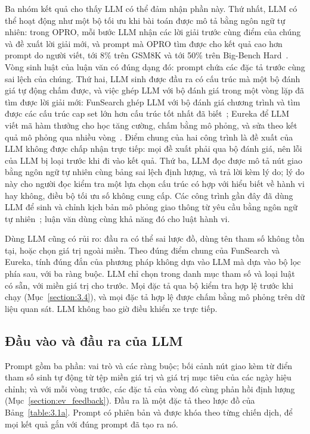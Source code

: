 \documentclass[../main.tex]{subfiles}
\begin{document}
Ba nhóm kết quả cho thấy LLM có thể đảm nhận phần này. Thứ nhất, LLM có thể hoạt động như một bộ tối ưu khi bài toán được mô tả bằng ngôn ngữ tự nhiên: trong OPRO, mỗi bước LLM nhận các lời giải trước cùng điểm của chúng và đề xuất lời giải mới, và prompt mà OPRO tìm được cho kết quả cao hơn prompt do người viết, tới 8\% trên GSM8K và tới 50\% trên Big-Bench Hard~\cite{yang2024opro}. Vòng sinh luật của luận văn có đúng dạng đó: prompt chứa các đặc tả trước cùng sai lệch của chúng. Thứ hai, LLM sinh được đầu ra có cấu trúc mà một bộ đánh giá tự động chấm được, và việc ghép LLM với bộ đánh giá trong một vòng lặp đã tìm được lời giải mới: FunSearch ghép LLM với bộ đánh giá chương trình và tìm được các cấu trúc cap set lớn hơn cấu trúc tốt nhất đã biết~\cite{romeraparedes2024funsearch}; Eureka để LLM viết mã hàm thưởng cho học tăng cường, chấm bằng mô phỏng, và sửa theo kết quả mô phỏng qua nhiều vòng~\cite{ma2024eureka}. Điểm chung của hai công trình là đề xuất của LLM không được chấp nhận trực tiếp: mọi đề xuất phải qua bộ đánh giá, nên lỗi của LLM bị loại trước khi đi vào kết quả. Thứ ba, LLM đọc được mô tả nút giao bằng ngôn ngữ tự nhiên cùng bảng sai lệch định lượng, và trả lời kèm lý do; lý do này cho người đọc kiểm tra một lựa chọn cấu trúc có hợp với hiểu biết về hành vi hay không, điều bộ tối ưu số không cung cấp. Các công trình gần đây đã dùng LLM để sinh và chỉnh kịch bản mô phỏng giao thông từ yêu cầu bằng ngôn ngữ tự nhiên~\cite{jeong2025agentsumo,li2026chatsumo}; luận văn dùng cùng khả năng đó cho luật hành vi.

Dùng LLM cũng có rủi ro: đầu ra có thể sai lược đồ, dùng tên tham số không tồn tại, hoặc chọn giá trị ngoài miền. Theo đúng điểm chung của FunSearch và Eureka, tính đúng đắn của phương pháp không dựa vào LLM mà dựa vào bộ lọc phía sau, với ba ràng buộc. LLM chỉ chọn trong danh mục tham số và loại luật có sẵn, với miền giá trị cho trước. Mọi đặc tả qua bộ kiểm tra hợp lệ trước khi chạy (Mục~\ref{section:3.4}), và mọi đặc tả hợp lệ được chấm bằng mô phỏng trên dữ liệu quan sát. LLM không bao giờ điều khiển xe trực tiếp.

\subsection{Đầu vào và đầu ra của LLM}

Prompt gồm ba phần: vai trò và các ràng buộc; bối cảnh nút giao kèm từ điển tham số sinh tự động từ tệp miền giá trị và giá trị mục tiêu của các ngày hiệu chỉnh; và với mỗi vòng trước, các đặc tả của vòng đó cùng phản hồi định lượng (Mục~\ref{section:ev_feedback}). Đầu ra là một đặc tả theo lược đồ của Bảng~\ref{table:3.1a}. Prompt có phiên bản và được khóa theo từng chiến dịch, để mọi kết quả gắn với đúng prompt đã tạo ra nó.
\end{document}
